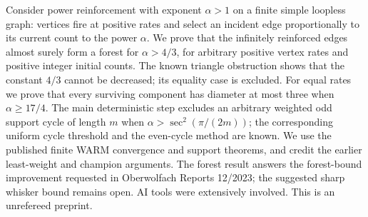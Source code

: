 Consider power reinforcement with exponent $\alpha>1$ on a finite simple
loopless graph: vertices fire at positive rates and select an incident edge
proportionally to its current count to the power $\alpha$.
We prove that the infinitely reinforced edges almost surely form a forest
for $\alpha>4/3$, for arbitrary positive vertex rates and positive integer
initial counts. The known triangle obstruction shows that the constant
$4/3$ cannot be decreased; its equality case is excluded.
For equal rates we prove that every surviving component has diameter at
most three when $\alpha\ge17/4$.
The main deterministic step excludes an arbitrary weighted odd support
cycle of length $m$ when $\alpha>\sec^2(\pi/(2m))$; the corresponding uniform
cycle threshold and the even-cycle method are known.
We use the published finite WARM convergence and support theorems, and
credit the earlier least-weight and champion arguments.
The forest result answers the forest-bound improvement requested in
Oberwolfach Reports 12/2023; the suggested sharp whisker bound remains open.
AI tools were extensively involved. This is an unrefereed preprint.
